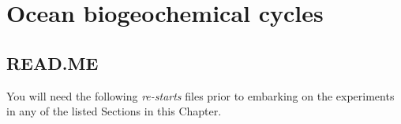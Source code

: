 
\cleardoublepage


\chapter{Ocean biogeochemical cycles}\label{ch:ocean-biogeochem}

\hfill \break

\vspace{24mm}

\noindent

\newpage

\section*{READ.ME}

You will need the following \textit{re-starts} files prior to embarking on the experiments in any of the listed  Sections in this Chapter.
\vspace{1mm}

